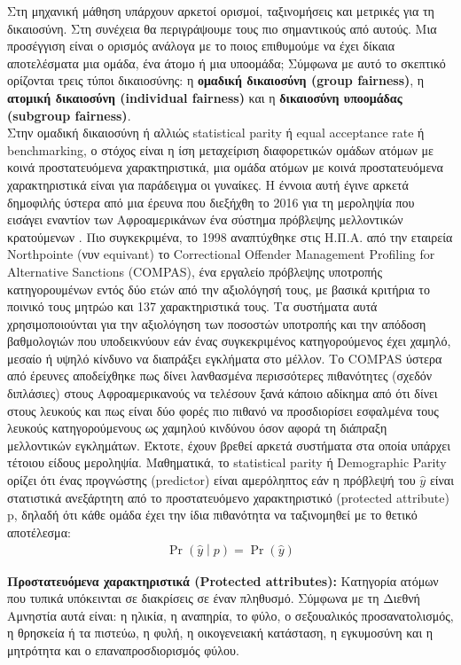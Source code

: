  Στη μηχανική μάθηση υπάρχουν αρκετοί ορισμοί, ταξινομήσεις και μετρικές για τη δικαιοσύνη. Στη συνέχεια θα περιγράψουμε τους πιο σημαντικούς από αυτούς. Μια προσέγγιση είναι ο ορισμός ανάλογα με το ποιος επιθυμούμε να έχει δίκαια αποτελέσματα μια ομάδα, ένα άτομο ή μια υποομάδα; Σύμφωνα με αυτό το σκεπτικό ορίζονται τρεις τύποι δικαιοσύνης: η \textbf{ ομαδική δικαιοσύνη (group fairness)}, η \textbf{ατομική δικαιοσύνη (individual fairness)} και η \textbf{δικαιοσύνη υποομάδας (subgroup fairness)}. \\
\noindent Στην ομαδική δικαιοσύνη ή αλλιώς statistical parity ή equal acceptance rate ή benchmarking, ο στόχος είναι η ίση μεταχείριση διαφορετικών ομάδων ατόμων με κοινά προστατευόμενα χαρακτηριστικά, μια ομάδα ατόμων με κοινά προστατευόμενα χαρακτηριστικά είναι για παράδειγμα οι γυναίκες. Η έννοια αυτή έγινε αρκετά δημοφιλής ύστερα από μια έρευνα που διεξήχθη το 2016 για τη μεροληψία που εισάγει εναντίον των Αφροαμερικάνων ένα σύστημα πρόβλεψης μελλοντικών κρατούμενων \cite{suryamattuMachineBias2016}. Πιο συγκεκριμένα, το 1998 αναπτύχθηκε στις Η.Π.Α. από την εταιρεία Northpointe (νυν equivant) το Correctional Offender Management Profiling for Alternative Sanctions (COMPAS), ένα εργαλείο πρόβλεψης υποτροπής κατηγορουμένων εντός δύο ετών από την αξιολόγησή τους, με βασικά κριτήρια το ποινικό τους μητρώο και 137 χαρακτηριστικά τους. Τα συστήματα αυτά χρησιμοποιούνται για την αξιολόγηση των ποσοστών υποτροπής και την απόδοση βαθμολογιών που υποδεικνύουν εάν ένας συγκεκριμένος κατηγορούμενος έχει χαμηλό, μεσαίο ή υψηλό κίνδυνο να διαπράξει εγκλήματα στο μέλλον. Το COMPAS ύστερα από έρευνες αποδείχθηκε πως δίνει λανθασμένα περισσότερες πιθανότητες (σχεδόν διπλάσιες) στους Αφροαμερικανούς να τελέσουν ξανά κάποιο αδίκημα από ότι δίνει στους λευκούς και πως είναι δύο φορές πιο πιθανό να προσδιορίσει εσφαλμένα τους λευκούς κατηγορούμενους ως χαμηλού κινδύνου όσον αφορά τη διάπραξη μελλοντικών εγκλημάτων. Έκτοτε, έχουν βρεθεί αρκετά συστήματα στα οποία υπάρχει τέτοιου είδους μεροληψία.
Μαθηματικά, το statistical parity ή Demographic Parity ορίζει ότι ένας προγνώστης (predictor) είναι αμερόληπτος εάν η πρόβλεψή του $ \hat{y} $ είναι στατιστικά ανεξάρτητη από το προστατευόμενο χαρακτηριστικό (protected attribute) p, δηλαδή ότι κάθε ομάδα έχει την ίδια πιθανότητα να ταξινομηθεί με το θετικό αποτέλεσμα:  
\begin{align*}
\Pr{\left(\hat{y}\middle| p\right)}=\Pr{\left(\hat{y}\right)}
\end{align*}
\begin{tcolorbox}[
	colframe=blue!25,
	colback=blue!10,
	coltitle=blue!20!black,  
	fonttitle=\bfseries,
	adjusted title= Ορισμός]
\textbf{Προστατευόμενα χαρακτηριστικά (Protected attributes):} Κατηγορία ατόμων που τυπικά υπόκεινται σε διακρίσεις σε έναν πληθυσμό. Σύμφωνα με τη Διεθνή Αμνηστία \cite{EqualityDiversityPolicy} αυτά είναι: η ηλικία, η αναπηρία, το φύλο, ο σεξουαλικός προσανατολισμός, η θρησκεία ή τα πιστεύω, η φυλή, η οικογενειακή κατάσταση, η εγκυμοσύνη και η μητρότητα και ο επαναπροσδιορισμός φύλου.
\end{tcolorbox}
